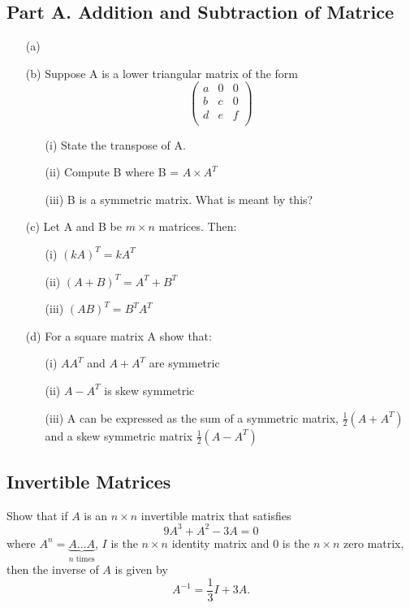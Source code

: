 \documentclass[12pt,a4paper]{article}
\begin{document}
\subsection*{Part A. Addition and Subtraction of Matrice}
\begin{itemize}
	\item[(a)] 
\item[(b)]
	Suppose A is a lower triangular matrix of the form 
	\[\left(
	\begin{matrix}
	a & 0 & 0 \\
	b & c & 0 \\
	d & e & f \\
	\end{matrix} \right)
	\]
	
	\begin{itemize}
\item[(i)] State the transpose of A.
\item[(ii)] Compute B where B = $ A \times A^{T}$
\item[(iii)] B is a symmetric matrix. What is meant by this?
	\end{itemize}
	
		
		\item[(c)] Let A and B be $m \times n$ matrices. Then:
		
		\begin{itemize}
			\item[(i)] $(kA)^T = kA^T$
			\item[(ii)] $(A+B)^T = A^T + B^T$
			\item[(iii)] $(AB)^T = B^TA^T$
		\end{itemize}
		
		
\item[(d)]For a square matrix A show that:
		
		\begin{itemize}
			\item[(i)] $AA^T$ and $A+A^T$ are symmetric
			\item[(ii)] $A-A^T$ is skew symmetric
			\item[(iii)] A can be expressed as the sum of a symmetric matrix, $\frac{1}{2}(A+A^T)$ and a skew 
			symmetric matrix $\frac{1}{2}(A-A^T)$
		\end{itemize}
		\end{itemize}
		

	
\subsection*{Invertible Matrices}	
\noindent	Show that if $A$ is an $n\times n$ invertible matrix that satisfies 
	$$
	9A^3+A^2-3A=0
	$$
	where $A^n=\underbrace{A\ldots A}_{\textrm{$n$ times}}$, %
	$I$ is the $n\times n$  identity matrix and $0$ is the $n\times n$  zero matrix,
	then the inverse of $A$ is given by  %
	$$
	A^{-1}=\frac13I+3A.
	$$\vfill
\end{document}
